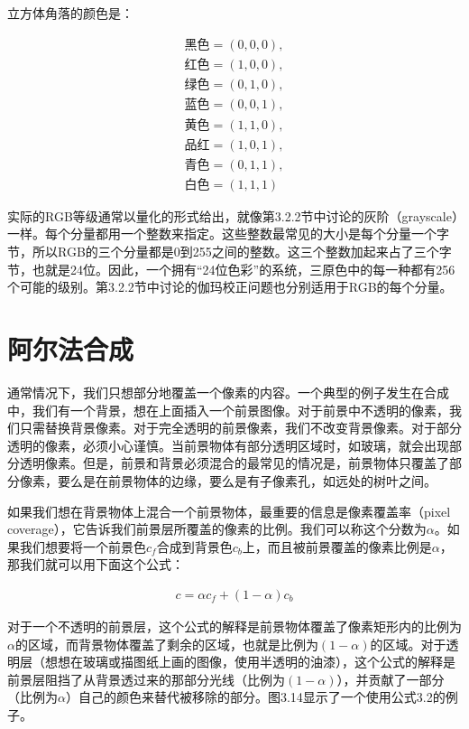 \documentclass[lang=cn,12pt]{elegantbook}
\begin{document}
立方体角落的颜色是：

\[
  \begin{aligned}
  \mbox{黑色} = (0,0,0),\\
  \mbox{红色} = (1,0,0),\\
  \mbox{绿色} = (0,1,0),\\
  \mbox{蓝色} = (0,0,1),\\
  \mbox{黄色} = (1,1,0),\\
  \mbox{品红} = (1,0,1),\\
  \mbox{青色} = (0,1,1),\\
  \mbox{白色} = (1,1,1)
  \end{aligned}
\]

实际的RGB等级通常以量化的形式给出，就像第3.2.2节中讨论的灰阶（grayscale）一样。每个分量都用一个整数来指定。这些整数最常见的大小是每个分量一个字节，所以RGB的三个分量都是0到255之间的整数。这三个整数加起来占了三个字节，也就是24位。因此，一个拥有“24位色彩”的系统，三原色中的每一种都有256个可能的级别。第3.2.2节中讨论的伽玛校正问题也分别适用于RGB的每个分量。

\section{阿尔法合成}

通常情况下，我们只想部分地覆盖一个像素的内容。一个典型的例子发生在合成中，我们有一个背景，想在上面插入一个前景图像。对于前景中不透明的像素，我们只需替换背景像素。对于完全透明的前景像素，我们不改变背景像素。对于部分透明的像素，必须小心谨慎。当前景物体有部分透明区域时，如玻璃，就会出现部分透明像素。但是，前景和背景必须混合的最常见的情况是，前景物体只覆盖了部分像素，要么是在前景物体的边缘，要么是有子像素孔，如远处的树叶之间。

如果我们想在背景物体上混合一个前景物体，最重要的信息是像素覆盖率（pixel coverage），它告诉我们前景层所覆盖的像素的比例。我们可以称这个分数为$\alpha $。如果我们想要将一个前景色$c_f$合成到背景色$c_b$上，而且被前景覆盖的像素比例是$\alpha $，那我们就可以用下面这个公式：

\begin{align}
  c = \alpha c_f + (1 - \alpha )c_b
\end{align}

对于一个不透明的前景层，这个公式的解释是前景物体覆盖了像素矩形内的比例为$\alpha $的区域，而背景物体覆盖了剩余的区域，也就是比例为$(1-\alpha )$的区域。对于透明层（想想在玻璃或描图纸上画的图像，使用半透明的油漆），这个公式的解释是前景层阻挡了从背景透过来的那部分光线（比例为$(1-\alpha )$），并贡献了一部分（比例为$\alpha $）自己的颜色来替代被移除的部分。图3.14显示了一个使用公式3.2的例子。
\end{document}
